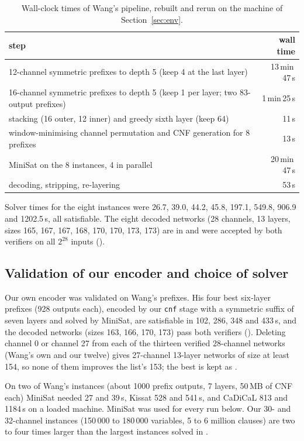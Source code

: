 \documentclass[11pt,a4paper]{article}
\theoremstyle{plain}
\theoremstyle{definition}
\theoremstyle{remark}
\begin{document}
\begin{table}[ht]
\centering\small
\caption{Wall-clock times of Wang's pipeline, rebuilt and rerun on the machine of Section~\ref{sec:env}.}
\label{tab:repro}
\begin{tabular}{@{}lr@{}}
\toprule
step & wall time \\
\midrule
12-channel symmetric prefixes to depth 5 (keep 4 at the last layer) & 13\,min\,47\,s \\
16-channel symmetric prefixes to depth 5 (keep 1 per layer; two 83-output prefixes) & 1\,min\,25\,s \\
stacking (16 outer, 12 inner) and greedy sixth layer (keep 64) & 11\,s \\
window-minimising channel permutation and CNF generation for 8 prefixes & 13\,s \\
MiniSat on the 8 instances, 4 in parallel & 20\,min\,47\,s \\
decoding, stripping, re-layering & 53\,s \\
\bottomrule
\end{tabular}
\end{table}

Solver times for the eight instances were 26.7, 39.0, 44.2, 45.8, 197.1, 549.8, 906.9 and 1202.5\,s, all satisfiable. The eight decoded networks (28 channels, 13 layers, sizes 165, 167, 167, 168, 170, 170, 173, 173) are in  and were accepted by both verifiers on all $2^{28}$ inputs ().

\subsection{Validation of our encoder and choice of solver}\label{sec:encoder}

Our own encoder was validated on Wang's prefixes. His four best six-layer prefixes (928 outputs each), encoded by our \texttt{cnf} stage with a symmetric suffix of seven layers and solved by MiniSat, are satisfiable in 102, 286, 348 and 433\,s, and the decoded networks (sizes 163, 166, 170, 173) pass both verifiers (). Deleting channel 0 or channel 27 from each of the thirteen verified 28-channel networks (Wang's own and our twelve) gives 27-channel 13-layer networks of size at least 154, so none of them improves the list's 153; the best is kept as .

On two of Wang's instances (about 1000 prefix outputs, 7 layers, 50\,MB of CNF each) MiniSat needed 27 and 39\,s, Kissat 528 and 541\,s, and CaDiCaL 813 and 1184\,s on a loaded machine. MiniSat was used for every run below. Our 30- and 32-channel instances (150\,000 to 180\,000 variables, 5 to 6 million clauses) are two to four times larger than the largest instances solved in \cite{CCEMS19}.
\end{document}
